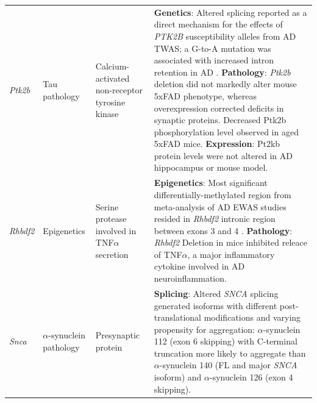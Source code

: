 \begin{landscape}
\begin{longtable}[c]{p{1cm}p{2cm}p{4cm}p{19cm}}
			
			\centering \textit{Ptk2b} &
			\centering Tau pathology  &
			\centering Calcium-activated non-receptor tyrosine kinase &			
			\tabitem \textbf{Genetics}: Altered splicing reported as a direct mechanism for the effects of \textit{PTK2B} susceptibility alleles from AD TWAS; a G-to-A mutation was associated with increased intron retention in AD \cite{Raj2018}.\newline
			\tabitem \textbf{Pathology}: \textit{Ptk2b} deletion did not markedly alter mouse 5xFAD phenotype, whereas overexpression corrected deficits in synaptic proteins. Decreased Ptk2b phosphorylation level observed in aged 5xFAD mice.\newline
			\tabitem \textbf{Expression}: Pt2kb protein levels were not altered in AD hippocampus or mouse model\cite{Giralt2018}.\\
						
		
			\centering \textit{Rhbdf2} &
			\centering Epigenetics  &
			\centering Serine protease involved in TNF$\alpha$ secretion &
			\tabitem \textbf{Epigenetics}: Most significant differentially-methylated region from meta-analysis of AD EWAS studies resided in \textit{Rhbdf2} intronic region between exons 3 and 4 \cite{Smith2021,DeJager2014, Lardenoije2019}.\newline
			\tabitem \textbf{Pathology}: \textit{Rhbdf2} Deletion in mice inhibited releace of TNF$\alpha$, a major inflammatory cytokine involved in AD neuroinflammation\cite{Levy2020}.\\
			\hdashline[0.5pt/5pt]
			
			\centering \textit{Snca} &
			\centering $\alpha$-synuclein pathology  &
			\centering Presynaptic protein &
			\tabitem \textbf{Splicing}: Altered \textit{SNCA} splicing generated isoforms with different post-translational modifications and varying propensity for aggregation: $\alpha$-synuclein 112 (exon 6 skipping) with C-terminal truncation more likely to aggregate than $\alpha$-synuclein 140 (FL and major \textit{SNCA} isoform) and $\alpha$-synuclein 126 (exon 4 skipping)\cite{Beyer2012, Beyer2006}.  \\
			

\end{longtable}
\end{landscape}

